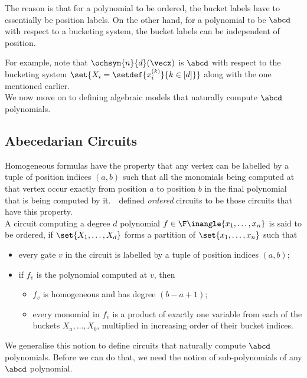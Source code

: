 The reason is that for a polynomial to be ordered, the bucket labels have to essentially be position labels.
On the other hand, for a polynomial to be $\abcd$ with respect to a bucketing system, the bucket labels can be independent of position.

For example, note that $\ochsym{n}{d}(\vecx)$ is $\abcd$ with respect to the bucketing system $\set{X_i = \setdef{x^{(k)}_i}{k \in [d]}}$ along with the one mentioned earlier.\\

\noindent We now move on to defining algebraic models that naturally compute $\abcd$ polynomials.

\subsection{Abecedarian Circuits}\label{sec:defn_abcd_ckts}

Homogeneous formulas have the property that any vertex can be labelled by a tuple of position indices $(a, b)$ such that all the monomials being computed at that vertex occur exactly from position $a$ to position $b$ in the final polynomial that is being computed by it.
\Hrubes $\text{}$ \etal $\text{}$ \cite{HWY11} defined \emph{ordered} circuits to be those circuits that have this property.\\

\noindent A circuit computing a degree $d$ polynomial $f \in \F \inangle{x_1, \ldots, x_n}$ is said to be ordered, if $\set{X_1, \ldots, X_d}$ forms a partition of $\set{x_1, \ldots, x_n}$ such that  
\begin{itemize}
	\item every gate $v$ in the circuit is labelled by a tuple of position indices $(a,b)$;
	\item if $f_v$ is the polynomial computed at $v$, then
	\begin{itemize}
		\item $f_v$ is homogeneous and has degree $(b-a+1)$;
		\item every monomial in $f_v$ is a product of exactly one variable from each of the buckets $X_a, \ldots, X_b$, multiplied in increasing order of their bucket indices.
	\end{itemize}
\end{itemize}

\noindent We generalise this notion to define circuits that naturally compute $\abcd$ polynomials.
Before we can do that, we need the notion of sub-polynomials of any $\abcd$ polynomial. 


